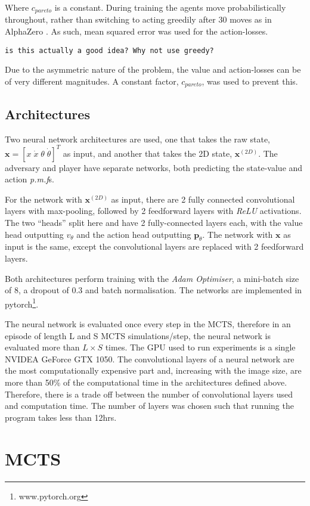 \documentclass[../main.tex]{subfiles}
\begin{document}
Where $c_{pareto}$ is a constant. During training the agents move probabilistically throughout, rather than switching to acting greedily after 30 moves as in AlphaZero \cite{AlphaZero}. As such, mean squared error was used for the action-losses.

\texttt{is this actually a good idea? Why not use greedy?}

Due to the asymmetric nature of the problem, the value and action-losses can be of very different magnitudes. A constant factor, $c_{pareto}$, was used to prevent this.

\subsection{Architectures}
Two neural network architectures are used, one that takes the raw state, $\boldsymbol{x} = [x \; \dot{x} \; \theta \; \dot{\theta}]^T$ as input, and another that takes the 2D state, $\boldsymbol{x}^{(2D)}$. The adversary and player have separate networks, both predicting the state-value and action \textit{p.m.f}s.

For the network with $\boldsymbol{x}^{(2D)}$ as input, there are 2 fully connected convolutional layers with max-pooling, followed by 2 feedforward layers with \textit{ReLU} activations. The two ``heads'' split here and have 2 fully-connected layers each, with the value head outputting $v_\theta$ and the action head outputting $\boldsymbol{p}_\theta$. The network with $\boldsymbol{x}$ as input is the same, except the convolutional layers are replaced with 2 feedforward layers.

Both architectures perform training with the \textit{Adam Optimiser}, a mini-batch size of 8, a dropout of 0.3 and batch normalisation. The networks are implemented in pytorch\footnote{www.pytorch.org}.

The neural network is evaluated once every step in the MCTS, therefore in an episode of length L and S MCTS simulations/step, the neural network is evaluated more than $L\times S$ times. The GPU used to run experiments is a single NVIDEA GeForce GTX 1050. The convolutional layers of a neural network are the most computationally expensive part and, increasing with the image size, are more than 50\% of the computational time in the architectures defined above. Therefore, there is a trade off between the number of convolutional layers used and computation time. The number of layers was chosen such that running the program takes less than 12hrs.

\section{MCTS}
\end{document}
